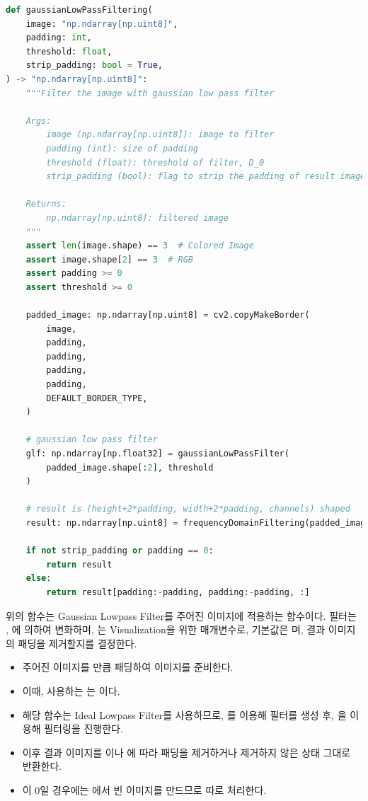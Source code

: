 \documentclass{report}
\begin{document}
\begin{lstlisting}[language=Python, caption=gaussianLowPassFiltering, firstnumber=168]
def gaussianLowPassFiltering(
    image: "np.ndarray[np.uint8]",
    padding: int,
    threshold: float,
    strip_padding: bool = True,
) -> "np.ndarray[np.uint8]":
    """Filter the image with gaussian low pass filter

    Args:
        image (np.ndarray[np.uint8]): image to filter
        padding (int): size of padding
        threshold (float): threshold of filter, D_0
        strip_padding (bool): flag to strip the padding of result image. Defaults to True

    Returns:
        np.ndarray[np.uint8]: filtered image
    """
    assert len(image.shape) == 3  # Colored Image
    assert image.shape[2] == 3  # RGB
    assert padding >= 0
    assert threshold >= 0

    padded_image: np.ndarray[np.uint8] = cv2.copyMakeBorder(
        image,
        padding,
        padding,
        padding,
        padding,
        DEFAULT_BORDER_TYPE,
    )

    # gaussian low pass filter
    glf: np.ndarray[np.float32] = gaussianLowPassFilter(
        padded_image.shape[:2], threshold
    )

    # result is (height+2*padding, width+2*padding, channels) shaped
    result: np.ndarray[np.uint8] = frequencyDomainFiltering(padded_image, glf)

    if not strip_padding or padding == 0:
        return result
    else:
        return result[padding:-padding, padding:-padding, :]
\end{lstlisting}

위의 함수는 Gaussian Lowpass Filter를 주어진 이미지에 적용하는 함수이다.
필터는 , 에 의하여 변화하며, 는 Visualization을 위한 매개변수로, 기본값은 며, 결과 이미지의 패딩을 제거할지를 결정한다.

\begin{itemize}
    \item 주어진 이미지를 만큼 패딩하여 이미지를 준비한다.
    \item 이때, 사용하는 는 이다.
    \item 해당 함수는 Ideal Lowpass Filter를 사용하므로, 를 이용해 필터를 생성 후, 을 이용해 필터링을 진행한다.
    \item 이후 결과 이미지를 이나 에 따라 패딩을 제거하거나 제거하지 않은 상태 그대로 반환한다.
    \item {}이 0일 경우에는 에서 빈 이미지를 만드므로 따로 처리한다.
\end{itemize}
\end{document}
